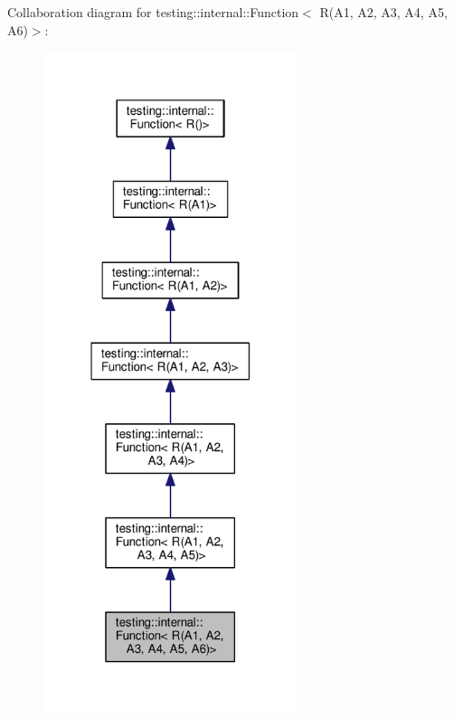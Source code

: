 Collaboration diagram for testing\+:\+:internal\+:\+:Function$<$ R(A1, A2, A3, A4, A5, A6)$>$\+:\nopagebreak
\begin{figure}[H]
\begin{center}
\leavevmode
\includegraphics[width=211pt]{structtesting_1_1internal_1_1Function_3_01R_07A1_00_01A2_00_01A3_00_01A4_00_01A5_00_01A6_08_4__coll__graph}
\end{center}
\end{figure}

